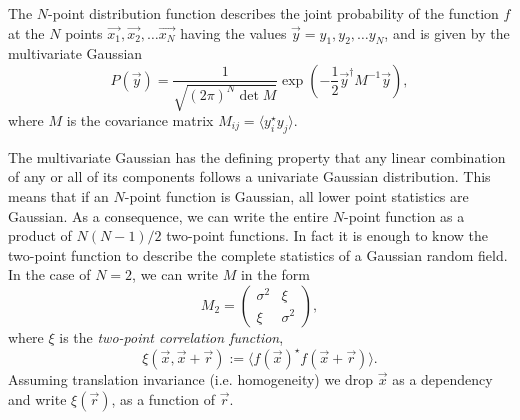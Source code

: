 \begin{subappendices}
The $N$-point distribution function describes the joint probability of the function $f$ at the $N$ points $\vec{x_1}, \vec{x_2}, \dots \vec{x_N}$ having the values $\vec{y} = y_1,y_2, \dots y_N$, and is given by the multivariate Gaussian
\[P(\vec{y}) = \frac{1}{\sqrt{{(2\pi)}^N \det M}}\exp\left(-\frac{1}{2} \vec{y}^{\dagger}M^{-1}\vec{y}\right), \label{eq:npoint}\]
where $M$ is the covariance matrix $M_{ij} = \langle y_i^{\star} y_j\rangle$.

The multivariate Gaussian has the defining property that any linear combination of any or all of its components follows a univariate Gaussian distribution. This means that if an $N$-point function is Gaussian, all lower point statistics are Gaussian.
As a consequence, we can write the entire $N$-point function as a product of $N(N-1)/2$ two-point functions. In fact it is enough to know the two-point function to describe the complete statistics of a Gaussian random field. In the case of $N=2$, we can write $M$ in the form
\[M_2 = \begin{pmatrix}
    \sigma^2 & \xi \\
    \xi & \sigma^2
\end{pmatrix},\]
where $\xi$ is the \emph{two-point correlation function},
\[\xi(\vec{x}, \vec{x} + \vec{r}) := \langle f(\vec{x})^{\star} f(\vec{x} + \vec{r}) \rangle.\]
Assuming translation invariance (i.e. homogeneity) we drop $\vec{x}$ as a dependency and write $\xi(\vec{r})$, as a function of $\vec{r}$.


\end{subappendices}
